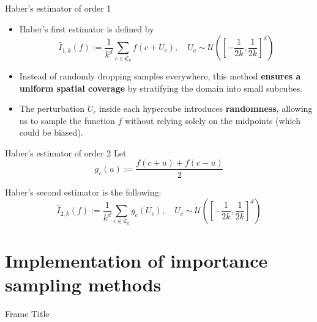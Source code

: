 \documentclass[aspectratio=169,xcolor=dvipsnames]{beamer}
\begin{document}
    \begin{frame}{Haber's estimator of order 1}
        \begin{itemize}
            \item Haber's first estimator is defined by
            $$\hat{I}_{1,k}(f) := \frac{1}{k^d} \sum_{c \in \mathfrak{C}_k} f(c + U_c), \quad U_c \sim \mathcal{U}\left(\left[-\frac{1}{2k}, \frac{1}{2k}\right]^d\right)$$
            \item Instead of randomly dropping samples everywhere, this method \textbf{ensures a uniform spatial coverage} by stratifying the domain into small subcubes.
        
            \item The perturbation $U_c$ inside each hypercube introduces \textbf{randomness}, allowing us to sample the function $f$ without relying solely on the midpoints (which could be biased).
        \end{itemize}
    
    \end{frame}

    \begin{frame}{Haber's estimator of order 2}
        Let
        $$g_c(u) := \frac{f(c + u) + f(c - u)}{2}$$

        Haber's second estimator is the following:
        $$\hat{I}_{2,k}(f) := \frac{1}{k^d} \sum_{c \in \mathfrak{C}_k} g_c(U_c), \quad U_c \sim \mathcal{U}\left(\left[-\frac{1}{2k}, \frac{1}{2k}\right]^d\right)$$
    \end{frame}

    \section{Implementation of importance sampling methods}

    \begin{frame}{Frame Title}
        
    \end{frame}
\end{document}
